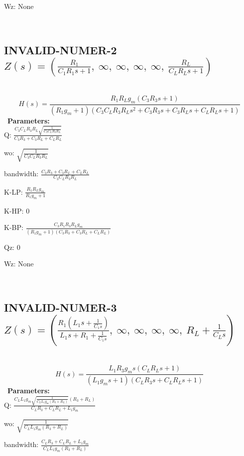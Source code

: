 \documentclass{article}
\begin{document}
Wz: $\text{None}$\ 

\ 

\subsection{INVALID-NUMER-2 $Z(s) = \left( \frac{R_{1}}{C_{1} R_{1} s + 1}, \  \infty, \  \infty, \  \infty, \  \infty, \  \frac{R_{L}}{C_{L} R_{L} s + 1}\right)$ } \ 
\textbf{\[H(s) = \frac{R_{1} R_{L} g_{m} \left(C_{3} R_{3} s + 1\right)}{\left(R_{1} g_{m} + 1\right) \left(C_{3} C_{L} R_{3} R_{L} s^{2} + C_{3} R_{3} s + C_{3} R_{L} s + C_{L} R_{L} s + 1\right)}\] } \ 
\textbf{Parameters:}\\ 

Q: $\frac{C_{3} C_{L} R_{3} R_{L} \sqrt{\frac{1}{C_{3} C_{L} R_{3} R_{L}}}}{C_{3} R_{3} + C_{3} R_{L} + C_{L} R_{L}}$\ 

wo: $\sqrt{\frac{1}{C_{3} C_{L} R_{3} R_{L}}}$\ 

bandwidth: $\frac{C_{3} R_{3} + C_{3} R_{L} + C_{L} R_{L}}{C_{3} C_{L} R_{3} R_{L}}$\ 

K-LP: $\frac{R_{1} R_{L} g_{m}}{R_{1} g_{m} + 1}$\ 

K-HP: $0$\ 

K-BP: $\frac{C_{3} R_{1} R_{3} R_{L} g_{m}}{\left(R_{1} g_{m} + 1\right) \left(C_{3} R_{3} + C_{3} R_{L} + C_{L} R_{L}\right)}$\ 

Qz: $0$\ 

Wz: $\text{None}$\ 

\ 

\subsection{INVALID-NUMER-3 $Z(s) = \left( \frac{R_{1} \left(L_{1} s + \frac{1}{C_{1} s}\right)}{L_{1} s + R_{1} + \frac{1}{C_{1} s}}, \  \infty, \  \infty, \  \infty, \  \infty, \  R_{L} + \frac{1}{C_{L} s}\right)$ } \ 
\textbf{\[H(s) = \frac{L_{1} R_{3} g_{m} s \left(C_{L} R_{L} s + 1\right)}{\left(L_{1} g_{m} s + 1\right) \left(C_{L} R_{3} s + C_{L} R_{L} s + 1\right)}\] } \ 
\textbf{Parameters:}\\ 

Q: $\frac{C_{L} L_{1} g_{m} \sqrt{\frac{1}{C_{L} L_{1} g_{m} \left(R_{3} + R_{L}\right)}} \left(R_{3} + R_{L}\right)}{C_{L} R_{3} + C_{L} R_{L} + L_{1} g_{m}}$\ 

wo: $\sqrt{\frac{1}{C_{L} L_{1} g_{m} \left(R_{3} + R_{L}\right)}}$\ 

bandwidth: $\frac{C_{L} R_{3} + C_{L} R_{L} + L_{1} g_{m}}{C_{L} L_{1} g_{m} \left(R_{3} + R_{L}\right)}$\ 
\end{document}
